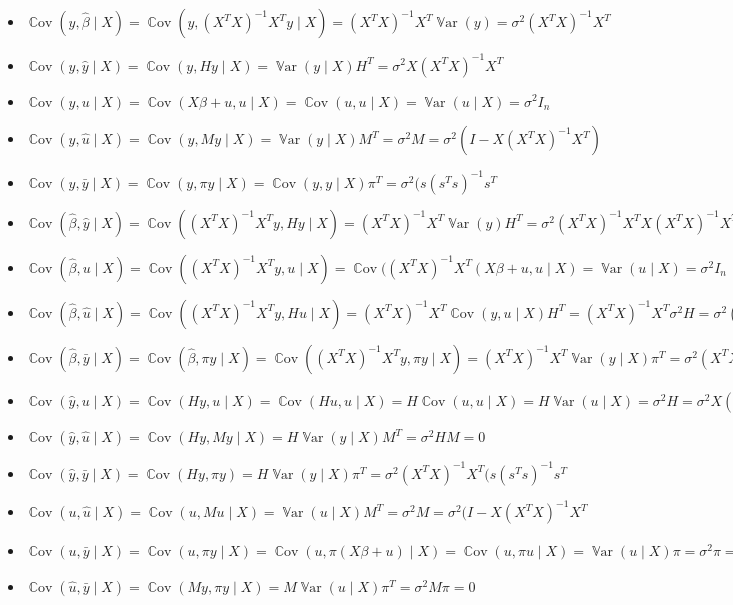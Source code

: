 \documentclass[12pt]{article}
\DeclareMathOperator{\Cov}{\mathbb{C}ov}
\DeclareMathOperator{\Var}{\mathbb{V}ar}
\newcommand{\hb}{\hat{\beta}}
\newcommand{\hu}{\hat{u}}
\newcommand{\hy}{\hat{y}}
\newcommand{\one}{s} %
\begin{document}
\begin{problem}
\begin{sol}
\begin{itemize}
    \item $\Cov(y,\hb \mid X) = \Cov(y, (X^TX)^{-1}X^Ty \mid X) = (X^TX)^{-1}X^T \Var(y) = \sigma^2 (X^TX)^{-1}X^T$
    \item $\Cov(y,\hy \mid X) = \Cov(y, Hy \mid X) = \Var(y \mid X)H^T = \sigma^2 X(X^TX)^{-1}X^T$
    \item $\Cov(y,u \mid X) = \Cov(X\beta+u,u \mid X) = \Cov(u,u \mid X) = \Var(u \mid X) = \sigma^2 I_n$
    \item $\Cov(y,\hu \mid X) = \Cov(y,My \mid X) = \Var(y \mid X)M^T = \sigma^2 M = \sigma^2 (I-X(X^TX)^{-1}X^T)$
    \item $\Cov(y,\bar{y} \mid X) = \Cov(y,\pi y \mid X) = \Cov(y,y \mid X)\pi^T = \sigma^2 (\one(\one^T\one)^{-1}\one^T$
    \item $\Cov(\hb,\hy \mid X) = \Cov((X^TX)^{-1}X^Ty,Hy \mid X) = (X^TX)^{-1}X^T\Var(y)H^T = \sigma^2(X^TX)^{-1}X^TX(X^TX)^{-1}X^T = \sigma^2 (X^TX)^{-1}X^T$
    \item $\Cov(\hb, u \mid X) = \Cov((X^TX)^{-1}X^Ty, u \mid X) = \Cov((X^TX)^{-1}X^T(X\beta+u, u \mid X) = \Var(u \mid X) = \sigma^2I_n$
    \item $\Cov(\hb, \hu \mid X) = \Cov((X^TX)^{-1}X^Ty, Hu \mid X) = (X^TX)^{-1}X^T\Cov(y,u \mid X)H^T = (X^TX)^{-1}X^T\sigma^2H = \sigma^2 (X^TX)^{-1}X^TX(X^TX)^{-1}X^T = \sigma^2(X^TX)^{-1}X^T$
    \item $\Cov(\hb,\bar{y} \mid X) = \Cov(\hb,\pi y \mid X) = \Cov((X^TX)^{-1}X^Ty,\pi y \mid X) = (X^TX)^{-1}X^T\Var(y \mid X)\pi^T = \sigma^2(X^TX)^{-1}X^T(\one^T\one)^{-1}\one^T$
    \item $\Cov(\hy,u \mid X) = \Cov(Hy,u \mid X) = \Cov(Hu,u \mid X) = H\Cov(u,u \mid X) = H\Var(u \mid X) = \sigma^2 H = \sigma^2 X(X^TX)^{-1}X^T$
    \item $\Cov(\hy,\hu \mid X) = \Cov(Hy,My \mid X) = H\Var(y\mid X)M^T = \sigma^2HM = 0$
    \item $\Cov(\hy,\bar{y} \mid X) = \Cov(Hy,\pi y) = H\Var(y \mid X)\pi^T = \sigma^2 (X^TX)^{-1}X^T(\one(\one^T\one)^{-1}\one^T$
    \item $\Cov(u,\hu \mid X) = \Cov(u, Mu \mid X) = \Var(u \mid X)M^T = \sigma^2M = \sigma^2(I-X(X^TX)^{-1}X^T$
    \item $\Cov(u,\bar{y} \mid X) = \Cov(u,\pi y \mid X) = \Cov(u, \pi(X\beta+u) \mid X) = \Cov(u,\pi u \mid X) = \Var(u \mid X) \pi = \sigma^2 \pi = \sigma^2 (\one(\one^T\one)^{-1}\one^T$
    \item $\Cov(\hu, \bar{y} \mid X) = \Cov(My,\pi y \mid X) = M\Var(u \mid X) \pi^T = \sigma^2 M\pi = 0$
\end{itemize}
\end{sol}
\end{problem}
\end{document}

